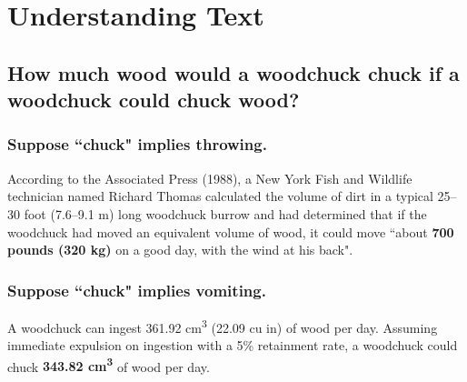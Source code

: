\documentclass[11pt]{scrartcl} %
\begin{document}


\section{Understanding Text}

\subsection{How much wood would a woodchuck chuck if a woodchuck could chuck wood?}


\subsubsection{Suppose ``chuck" implies throwing.}

According to the Associated Press (1988), a New York Fish and Wildlife technician named Richard Thomas calculated the volume of dirt in a typical 25--30 foot (7.6--9.1 m) long woodchuck burrow and had determined that if the woodchuck had moved an equivalent volume of wood, it could move ``about \textbf{700 pounds (320 kg)} on a good day, with the wind at his back".


\subsubsection{Suppose ``chuck" implies vomiting.}

A woodchuck can ingest 361.92 cm\textsuperscript{3} (22.09 cu in) of wood per day. Assuming immediate expulsion on ingestion with a 5\% retainment rate, a woodchuck could chuck \textbf{343.82 cm\textsuperscript{3}} of wood per day.
\end{document}
